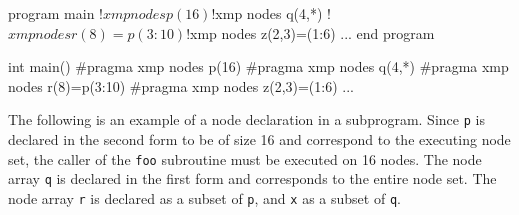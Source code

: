 
\vspace{0.5cm}

\begin{minipage}{0.45\hsize}
\begin{center}
\begin{Fexample}
      program main
!$xmp nodes p(16)
!$xmp nodes q(4,*)
!$xmp nodes r(8)=p(3:10)
!$xmp nodes z(2,3)=(1:6)
      ...       
      end program 
\end{Fexample}
\end{center}
\end{minipage}
%
\begin{minipage}{0.45\hsize}
\begin{center}
\begin{CexampleR}
int main() {
#pragma xmp nodes p(16)
#pragma xmp nodes q(4,*)
#pragma xmp nodes r(8)=p(3:10)
#pragma xmp nodes z(2,3)=(1:6)
    ...
}
\end{CexampleR}
\end{center}
\end{minipage}

\vspace{0.5cm}

%

The following is an example of a node declaration in a subprogram.
Since {\tt p} is declared in the second form to be of size 16 and
correspond to the executing node set, the caller of the {\tt foo}
subroutine must be executed on 16 nodes.
%
The node array {\tt q} is declared in the first form and corresponds to
the entire node set. The node array {\tt r} is declared as a subset of
{\tt p}, and {\tt x} as a subset of {\tt q}.

